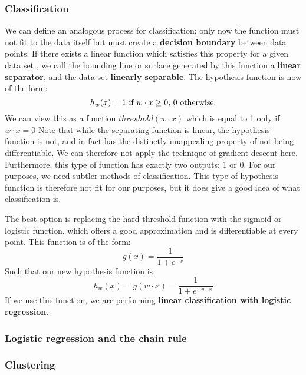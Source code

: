 \subsubsection{Classification} 

We can define an analogous process for classification; only now
the function must not fit to the data itself but must create a
\textbf{decision boundary} between data points. If there exists a
linear function which satisfies this property for a given data set
, we call the bounding line or surface generated by this function a
\textbf{linear separator}, and the data set \textbf{linearly
  separable}. The hypothesis function is now of the form:
\begin{equation}
  h_w(x) = 1$ if $ w \cdot x \geq 0$, $0$ otherwise.$
\end{equation}
We can view this as a function $threshold(w \cdot x)$ which is
equal to 1 only if $w \cdot x = 0$ Note that while the separating
function is linear, the hypothesis function is not, and in fact has
the distinctly unappealing property of not being differentiable. We
can therefore not apply the technique of gradient descent
here. Furthermore, this type of function has exactly two outputs: 1 or
0. For our purposes, we need subtler methods of classification.  This
type of hypothesis function is therefore not fit for our purposes, but
it does give a good idea of what classification is.

The best option is replacing the hard threshold function with the
sigmoid or logistic function, which offers a good approximation and is
differentiable at every point. This function is of the form:
\begin{equation}
  g(x) = \frac{1}{1 + e^{-x}}
\end{equation}
Such that our new hypothesis function is:
\begin{equation}
  h_w(x) = g(w \cdot x) = \frac{1}{1 + e^{- w \cdot x}}
\end{equation}
If we use this function, we are performing \textbf{linear
  classification with logistic regression}.

\subsubsection{Logistic regression and the chain rule}
\subsubsection{Clustering}

